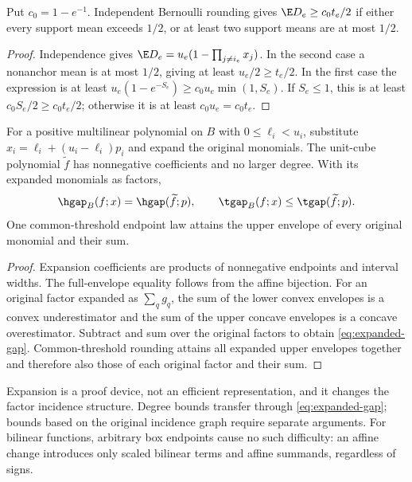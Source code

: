 \begin{lemma}\label{lem:easy-terms}
Put $c_0=1-e^{-1}$. Independent Bernoulli rounding gives
$\E D_e\ge c_0t_e/2$ if either every support mean exceeds $1/2$, or at
least two support means are at most $1/2$.
\end{lemma}
\begin{proof}
Independence gives $\E D_e=u_e(1-\prod_{j\ne i_e}x_j)$. In the second
case a nonanchor mean is at most $1/2$, giving at least $u_e/2\ge t_e/2$.
In the first case the expression is at least
$u_e(1-e^{-S_e})\ge c_0u_e\min(1,S_e)$. If $S_e\le1$, this is at least
$c_0S_e/2\ge c_0t_e/2$; otherwise it is at least $c_0u_e=c_0t_e$.
\end{proof}

\begin{proposition}\label{prop:box-transfer}
For a positive multilinear polynomial on $B$ with $0\le\ell_i<u_i$,
substitute $x_i=\ell_i+(u_i-\ell_i)p_i$ and expand the original monomials.
The unit-cube polynomial $\widetilde f$ has nonnegative coefficients and
no larger degree. With its expanded monomials as factors,
\begin{equation}\label{eq:expanded-gap}
 \hgap_B(f;x)=\hgap(\widetilde f;p),\qquad
 \tgap_B(f;x)\le\tgap(\widetilde f;p).
\end{equation}
One common-threshold endpoint law attains the upper envelope of every
original monomial and their sum.
\end{proposition}
\begin{proof}
Expansion coefficients are products of nonnegative endpoints and interval
widths. The full-envelope equality follows from the affine bijection.
For an original factor expanded as $\sum_q g_q$, the sum of the lower
convex envelopes is a convex underestimator and the sum of the upper
concave envelopes is a concave overestimator. Subtract and sum over the
original factors to obtain \eqref{eq:expanded-gap}. Common-threshold
rounding attains all expanded upper envelopes together and therefore also
those of each original factor and their sum.
\end{proof}

Expansion is a proof device, not an efficient representation, and it
changes the factor incidence structure. Degree bounds transfer through
\eqref{eq:expanded-gap}; bounds based on the original incidence graph
require separate arguments. For bilinear functions, arbitrary box endpoints
cause no such difficulty: an affine change introduces only scaled bilinear
terms and affine summands, regardless of signs.

